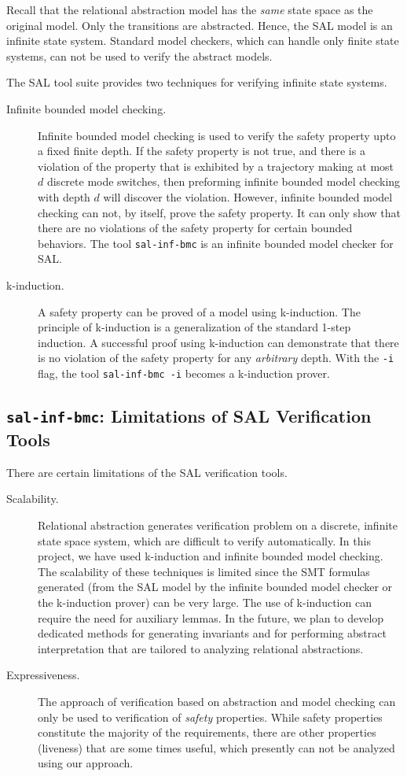 \documentclass{llncs}
\begin{document}
Recall that the relational abstraction model has the {\em{same}}
state space as the original model.  Only the transitions are
abstracted.  Hence, the SAL model is an infinite state system.
Standard model checkers, which can handle only finite state systems,
can not be used to verify the abstract models.

The SAL tool suite provides two techniques for verifying infinite
state systems.
\begin{description}
\item[Infinite bounded model checking.]
Infinite bounded model checking is used to verify the safety property
upto a fixed finite depth.  If the safety property is not true, and
there is a violation of the property that is exhibited by a trajectory
making at most $d$ discrete mode switches, then 
preforming infinite bounded model checking with depth $d$ will
discover the violation.
However, infinite bounded model checking can not, by itself, 
prove the safety property.  It can only show that there are no
violations of the safety property for certain bounded behaviors.
The tool {\tt{sal-inf-bmc}} is an infinite bounded model checker
for SAL.
\item[k-induction.]
A safety property can be proved of a model using k-induction.
The principle of k-induction is a generalization of the standard
1-step induction.  A successful proof using k-induction can
demonstrate that there is no violation of the safety property
for any {\em{arbitrary}} depth.
With the {\tt{-i}} flag, the tool {\tt{sal-inf-bmc -i}}
becomes a k-induction prover.
\end{description}

\subsection{{\tt{sal-inf-bmc}}: Limitations of SAL Verification Tools}

There are certain limitations of the SAL verification tools.
\begin{description}
\item[Scalability.]
Relational abstraction generates verification 
problem on a discrete, infinite state space system, which are difficult to
verify automatically.  
In this project, we have used k-induction and infinite bounded
model checking.  The scalability of these techniques is limited
since 
the SMT formulas generated (from the SAL model by the infinite
bounded model checker or the k-induction prover) can be very large.
The use of k-induction can require the need for auxiliary lemmas.  
In the future, we plan to develop dedicated methods for generating 
invariants and for performing abstract interpretation 
that are tailored to analyzing relational abstractions.
\item[Expressiveness.]
The approach of verification based on abstraction and model checking
can only be used to verification of {\em{safety}} properties.
While safety properties constitute the majority of the requirements,
there are other properties (liveness) that are some times useful,
which presently can not be analyzed using our approach.
\end{description}
\end{document}
